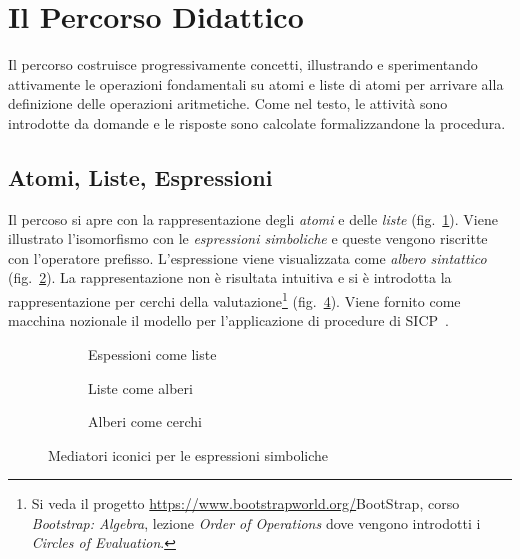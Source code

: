 \documentclass[withtimes]{easychair}
\begin{document}
\section{Il Percorso Didattico}\label{il-percorso-didattico}

Il percorso costruisce progressivamente concetti, illustrando e sperimentando attivamente le operazioni fondamentali su atomi e liste di atomi per arrivare alla definizione delle operazioni aritmetiche. Come nel testo, le attività sono introdotte da domande e le risposte sono calcolate formalizzandone la procedura.

\subsection{Atomi, Liste, Espressioni}\label{strutture-dati-e-espressioni}

Il percoso si apre con la rappresentazione degli \emph{atomi} e delle \emph{liste} (fig.~\ref{fig:lista}). Viene illustrato l'isomorfismo con le \emph{espressioni simboliche} e queste vengono riscritte con l'operatore prefisso. L'espressione viene visualizzata come \emph{albero sintattico} (fig.~\ref{fig:albero}). La rappresentazione non è risultata intuitiva e si è introdotta la rappresentazione per cerchi della valutazione\footnote{Si veda il progetto \url{https://www.bootstrapworld.org/}{BootStrap}, corso \emph{Bootstrap: Algebra}, lezione \emph{Order of Operations} dove vengono introdotti i \emph{Circles of Evaluation}.} (fig.~\ref{fig:cerchio}). Viene fornito come macchina nozionale il modello per l'applicazione di procedure di SICP~\cite[par.~\mbox{1.1.5} The Substitution Model for Procedure Application]{Abelson1996}.

\begin{figure}
    \centering

    \begin{subfigure}[t]{0.8\textwidth}
      \centering
      
      \caption{Espessioni come liste\label{fig:lista}}
    \end{subfigure}

    \vspace{1em}

    \begin{minipage}{0.8\textwidth}
      \centering
      \begin{subfigure}[b]{0.35\textwidth}
        \centering
        
        \caption{Liste come alberi\label{fig:albero}}
      \end{subfigure}
      \quad
      \begin{subfigure}[b]{0.35\textwidth}
        \centering
        
        \caption{Alberi come cerchi\label{fig:cerchio}}
      \end{subfigure}
    \end{minipage}

  \caption{Mediatori iconici per le espressioni simboliche}
\end{figure}
\end{document}
